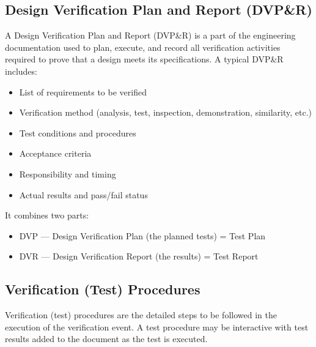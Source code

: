 \documentclass[12pt]{article}
\begin{document}
\subsection{Design Verification Plan and Report (DVP\&R)}
A Design Verification Plan and Report (DVP\&R) is a part of the engineering documentation used to plan, execute, and record all verification activities required to prove that a design meets its specifications. 
A typical DVP\&R includes:
\begin{itemize}
\item List of requirements to be verified 
\item Verification method (analysis, test, inspection, demonstration, similarity, etc.) 
\item Test conditions and procedures 
\item Acceptance criteria 
\item Responsibility and timing 
\item Actual results and pass/fail status 
\end{itemize}
It combines two parts:
\begin{itemize}
\item DVP — Design Verification Plan (the planned tests) = Test Plan
\item DVR — Design Verification Report (the results) = Test Report
\end{itemize}


\subsection{Verification (Test) Procedures}
Verification (test) procedures are the detailed steps to be followed in the execution of the verification event.
A test procedure may be interactive with test results added to the document as the test is executed.
\end{document}
